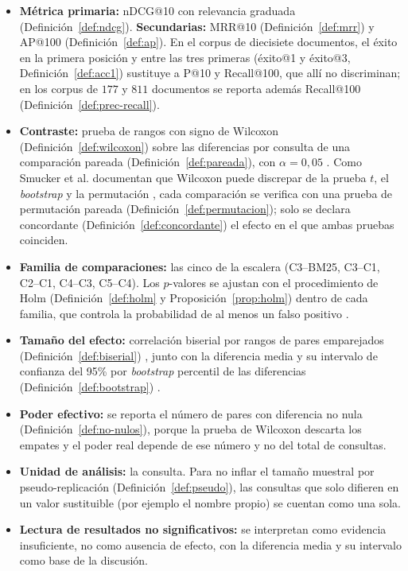 \documentclass[11pt,letterpaper]{article}
\numberwithin{equation}{section}
\begin{document}
\begin{itemize}[leftmargin=1.6em,itemsep=1pt]
  \item \textbf{Métrica primaria:} nDCG@10 con relevancia graduada (Definición~\ref{def:ndcg}). \textbf{Secundarias:} MRR@10 (Definición~\ref{def:mrr}) y AP@100 (Definición~\ref{def:ap}). En el corpus de diecisiete documentos, el éxito en la primera posición y entre las tres primeras (éxito@1 y éxito@3, Definición~\ref{def:acc1}) sustituye a P@10 y Recall@100, que allí no discriminan; en los corpus de $177$ y $811$ documentos se reporta además Recall@100 (Definición~\ref{def:prec-recall}).
  \item \textbf{Contraste:} prueba de rangos con signo de Wilcoxon (Definición~\ref{def:wilcoxon}) sobre las diferencias por consulta de una comparación pareada (Definición~\ref{def:pareada}), con $\alpha=0{,}05$ \cite{wilcoxon1945}. Como Smucker et al. documentan que Wilcoxon puede discrepar de la prueba $t$, el \textit{bootstrap} y la permutación \cite{smucker2007significance}, cada comparación se verifica con una prueba de permutación pareada (Definición~\ref{def:permutacion}); solo se declara concordante (Definición~\ref{def:concordante}) el efecto en el que ambas pruebas coinciden.
  \item \textbf{Familia de comparaciones:} las cinco de la escalera (C3--BM25, C3--C1, C2--C1, C4--C3, C5--C4). Los $p$-valores se ajustan con el procedimiento de Holm (Definición~\ref{def:holm} y Proposición~\ref{prop:holm}) dentro de cada familia, que controla la probabilidad de al menos un falso positivo \cite{holm1979}.
  \item \textbf{Tamaño del efecto:} correlación biserial por rangos de pares emparejados (Definición~\ref{def:biserial}) \cite{kerby2014}, junto con la diferencia media y su intervalo de confianza del 95\% por \textit{bootstrap} percentil de las diferencias (Definición~\ref{def:bootstrap}) \cite{efron1979bootstrap}.
  \item \textbf{Poder efectivo:} se reporta el número de pares con diferencia no nula (Definición~\ref{def:no-nulos}), porque la prueba de Wilcoxon descarta los empates y el poder real depende de ese número y no del total de consultas.
  \item \textbf{Unidad de análisis:} la consulta. Para no inflar el tamaño muestral por pseudo-replicación (Definición~\ref{def:pseudo}), las consultas que solo difieren en un valor sustituible (por ejemplo el nombre propio) se cuentan como una sola.
  \item \textbf{Lectura de resultados no significativos:} se interpretan como evidencia insuficiente, no como ausencia de efecto, con la diferencia media y su intervalo como base de la discusión.
\end{itemize}
\end{document}

